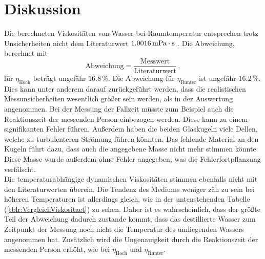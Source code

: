 \section{Diskussion}
\label{sec:Diskussion}
Die berechneten Viskositäten von Wasser bei Raumtemperatur entsprechen trotz Unsicherheiten nicht
dem Literaturwert $1.0016 \,\unit[inter-unit-product=\cdot]{\milli\pascal\second}$ \cite{wasserVisk}. Die Abweichung, berechnet mit 
\begin{equation}
  \text{Abweichung}= \frac{\text{Messwert}}{\text{Literaturwert}}\, , 
\end{equation}
 für $\eta_{\text{Hoch}}$ 
beträgt ungefähr $16.8 \,\%$. Die Abweichung für $\eta_{\text{Runter}}$ ist ungefähr $16.2 \,\%$. \\ 
Dies kann unter anderem darauf zurückgeführt werden, 
dass die realistischen Messunsicherheiten wesentlich größer sein werden, als in der Auswertung angenommen. Bei der Messung der Fallzeit müsste zum Beispiel auch die 
Reaktionszeit der messenden Person einbezogen werden. Diese kann zu einem signifikanten Fehler führen. Außerdem haben die beiden Glaskugeln viele Dellen, welche 
zu turbulenteren Strömung führen könnten. Das fehlende Material an den Kugeln führt dazu, dass auch die angegebene Masse nicht mehr stimmen könnte. Diese Masse wurde 
außerdem ohne Fehler angegeben, was die Fehlerfortpflanzung verfälscht. 
\\
Die temperaturabhängige dynamischen Viskositäten stimmen ebenfalls nicht mit den Literaturwerten überein. Die Tendenz des Mediums weniger zäh 
zu sein bei höheren Temperaturen ist allerdings gleich, wie in der untenstehenden Tabelle (\ref{tblr:VergleichViskositaet}) zu sehen. Daher ist es wahrscheinlich, dass der größte Teil der Abweichung dadurch zustande kommt, 
dass das destillierte Wasser zum Zeitpunkt der Messung noch nicht die Temperatur des umliegenden Wassers angenommen hat. Zusätzlich wird die Ungenauigkeit
durch die Reaktionszeit der messenden Person erhöht, wie bei $\eta_{\text{Hoch}}$ und $\eta_{\text{Runter}}$. 
 \\
